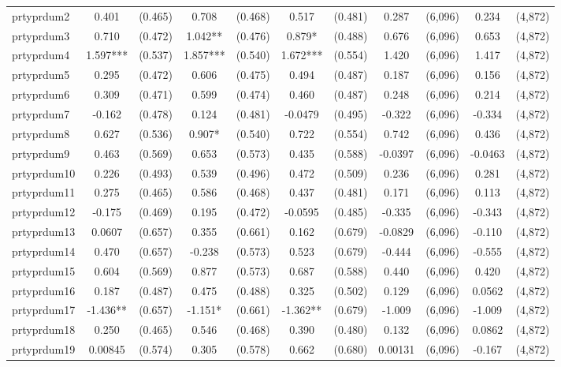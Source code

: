 \documentclass[]{article}
\begin{document}
\begin{tabular}{lcccccccccc}
prtyprdum2 & 0.401 & (0.465) & 0.708 & (0.468) & 0.517 & (0.481) & 0.287 & (6,096) & 0.234 & (4,872) \\
prtyprdum3 & 0.710 & (0.472) & 1.042** & (0.476) & 0.879* & (0.488) & 0.676 & (6,096) & 0.653 & (4,872) \\
prtyprdum4 & 1.597*** & (0.537) & 1.857*** & (0.540) & 1.672*** & (0.554) & 1.420 & (6,096) & 1.417 & (4,872) \\
prtyprdum5 & 0.295 & (0.472) & 0.606 & (0.475) & 0.494 & (0.487) & 0.187 & (6,096) & 0.156 & (4,872) \\
prtyprdum6 & 0.309 & (0.471) & 0.599 & (0.474) & 0.460 & (0.487) & 0.248 & (6,096) & 0.214 & (4,872) \\
prtyprdum7 & -0.162 & (0.478) & 0.124 & (0.481) & -0.0479 & (0.495) & -0.322 & (6,096) & -0.334 & (4,872) \\
prtyprdum8 & 0.627 & (0.536) & 0.907* & (0.540) & 0.722 & (0.554) & 0.742 & (6,096) & 0.436 & (4,872) \\
prtyprdum9 & 0.463 & (0.569) & 0.653 & (0.573) & 0.435 & (0.588) & -0.0397 & (6,096) & -0.0463 & (4,872) \\
prtyprdum10 & 0.226 & (0.493) & 0.539 & (0.496) & 0.472 & (0.509) & 0.236 & (6,096) & 0.281 & (4,872) \\
prtyprdum11 & 0.275 & (0.465) & 0.586 & (0.468) & 0.437 & (0.481) & 0.171 & (6,096) & 0.113 & (4,872) \\
prtyprdum12 & -0.175 & (0.469) & 0.195 & (0.472) & -0.0595 & (0.485) & -0.335 & (6,096) & -0.343 & (4,872) \\
prtyprdum13 & 0.0607 & (0.657) & 0.355 & (0.661) & 0.162 & (0.679) & -0.0829 & (6,096) & -0.110 & (4,872) \\
prtyprdum14 & 0.470 & (0.657) & -0.238 & (0.573) & 0.523 & (0.679) & -0.444 & (6,096) & -0.555 & (4,872) \\
prtyprdum15 & 0.604 & (0.569) & 0.877 & (0.573) & 0.687 & (0.588) & 0.440 & (6,096) & 0.420 & (4,872) \\
prtyprdum16 & 0.187 & (0.487) & 0.475 & (0.488) & 0.325 & (0.502) & 0.129 & (6,096) & 0.0562 & (4,872) \\
prtyprdum17 & -1.436** & (0.657) & -1.151* & (0.661) & -1.362** & (0.679) & -1.009 & (6,096) & -1.009 & (4,872) \\
prtyprdum18 & 0.250 & (0.465) & 0.546 & (0.468) & 0.390 & (0.480) & 0.132 & (6,096) & 0.0862 & (4,872) \\
prtyprdum19 & 0.00845 & (0.574) & 0.305 & (0.578) & 0.662 & (0.680) & 0.00131 & (6,096) & -0.167 & (4,872) \\

\end{tabular}
\end{document}
